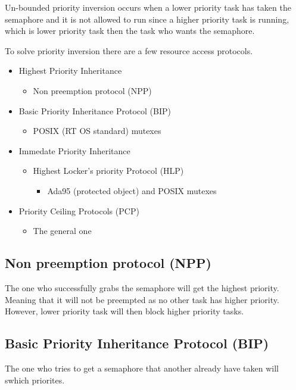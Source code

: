 Un-bounded priority inversion occurs when a lower priority task has taken
the semaphore and it is not allowed to run since a higher priority task
is running, which is lower priority task then the task who wants the semaphore.

To solve priority inversion there are a few resource access protocols.
\begin{itemize}
  \item Highest Priority Inheritance
  \begin{itemize}
    \item Non preemption protocol (NPP)
  \end{itemize}
  \item Basic Priority Inheritance Protocol (BIP)
  \begin{itemize}
    \item POSIX (RT OS standard) mutexes
  \end{itemize}
  \item Immedate Priority Inheritance
  \begin{itemize}
    \item Highest Locker's priority Protocol (HLP)
    \begin{itemize}
      \item Ada95 (protected object) and POSIX mutexes
    \end{itemize}
  \end{itemize}
  \item Priority Ceiling Protocols (PCP)
  \begin{itemize}
    \item The general one
  \end{itemize}
\end{itemize}


\subsection{Non preemption protocol (NPP)}
The one who successfully grabs the semaphore will get the highest priority.
Meaning that it will not be preempted as no other task has higher priority.
However, lower priority task will then block higher priority tasks.



\subsection{Basic Priority Inheritance Protocol (BIP)}
The one who tries to get a semaphore that another already have taken will swhich priorites.

